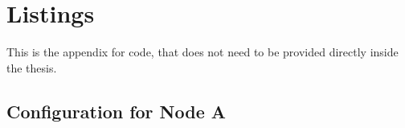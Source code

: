 
\cleardoublepage
\chapter{Listings}
\label{app:listings}

This is the appendix for code, that does not need to be provided directly inside the thesis.

\section{Configuration for Node A}


